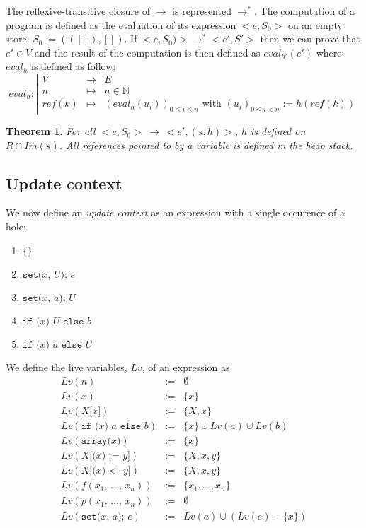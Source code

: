\documentclass[12pt,a4paper]{article}
\newcommand{\cl}[1]{\texttt{#1}}
\newtheorem{theorem}{Theorem}
\newcommand{\N}{\mathbb{N}}
\newcommand{\ucont}[1]{\{#1\}}
\begin{document}
The reflexive-transitive closure of $\longrightarrow$  is represented $ \longrightarrow^*$.
The computation of a program is defined as the evaluation of its expression $<e, S_0>$ on an empty store: $S_0 := (([]), [])$.
If $<e, S_0)> \longrightarrow^* <e', S'>$ then we can prove that $e' \in V$ and the result of the computation is then defined as $eval_{h'}(e')$ where $eval_h$ is defined as follow:
$$ eval_h : \left|
\begin{array}{ccl}
V &\longrightarrow & E \\
n &\mapsto& n \in \N \\
ref(k) &\mapsto& \left( eval_h(u_i) \right)_{0 \leq i \leq n} \text{ with } (u_i)_{0 \leq i < n} := h(ref(k))
\end{array}
\right. $$

\begin{theorem}
For all $<e, S_0> \ \longrightarrow \ <e', (s,h)>$, $h$ is defined on $R \cap Im(s)$. All references pointed to by a variable is defined in the heap stack.
\end{theorem}



\subsection{Update context}

We now define an \emph{update context} as an expression with a single occurence of a hole:
\begin{enumerate}
\itemsep-0.2em
\item $\ucont{}$
\item $\cl{set(} x \cl{, } U \cl{); } e $
\item $\cl{set(} x \cl{, } a \cl{); } U $
\item $ \cl{if (} x \cl{) } U \cl{ else } b $
\item $ \cl{if (} x \cl{) } a \cl{ else } U $
\end{enumerate}


We define the live variables, $Lv$, of an expression as
\begin{eqnarray*}
Lv( n ) & := & \emptyset \\
Lv( x ) & := & \{ x \} \\
Lv( X\cl{[}x\cl{]} ) & := & \{ X, x \} \\
Lv( \cl{if (} x \cl{) } a \cl{ else } b) & := & \{ x \} \cup Lv(a) \cup Lv(b) \\
Lv( \cl{array(} x \cl{)} ) & := & \{ x \} \\
Lv( X \cl{[(} x \cl{) := } y \cl{]} ) & := & \{ X, x, y \} \\
Lv( X \cl{[(} x \cl{) <- } y \cl{]} ) & := & \{ X, x, y \} \\
Lv( f(x_1 \cl{, } ... \cl{, } x_n) ) & := & \{ x_1, ... , x_n \} \\
Lv( p(x_1 \cl{, } ... \cl{, } x_n) ) & := & \emptyset \\
Lv( \cl{set(} x \cl{, } a \cl{); } e ) &:=& Lv(a) \cup \left( Lv(e) - \{ x \} \right)
\end{eqnarray*}
\end{document}
